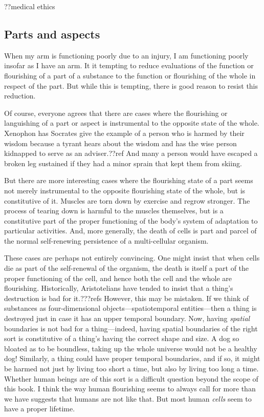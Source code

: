??medical ethics

\subsection{Parts and aspects}
When my arm is functioning poorly due to an injury, I am functioning poorly insofar
as I have an arm. It it tempting to reduce evaluations of the function or flourishing
of a part of a substance to the function or flourishing of the whole in respect of the
part. But while this is tempting, there is good reason to resist this reduction.

Of course, everyone agrees that there are cases where the flourishing or languishing of a part or aspect is
instrumental to the opposite state of the whole. Xenophon has Socrates give the example of a 
person who is harmed by their wisdom because a tyrant hears about the wisdom and has the
wise person kidnapped to serve as an adviser.??ref And many a person would have escaped a broken
leg sustained if they had a minor sprain that kept them from skiing. 

But there are more interesting cases where the flourishing state of a part seems not merely instrumental to 
the opposite flourishing state of the whole, but is constitutive of it. Muscles are torn down by exercise
and regrow stronger. The process of tearing down is harmful to the muscles themselves, but is a constitutive 
part of the proper functioning of the body's system of adaptation to particular activities. And, more
generally, the death of cells is part and parcel of the normal self-renewing persistence of a multi-cellular
organism.

These cases are perhaps not entirely convincing. One might insist that when cells die as part of the self-renewal
of the organism, the death is itself a part of the proper functioning of the cell, and hence both the cell and the
whole are flourishing. Historically, Aristotelians have tended to insist that a thing's destruction is bad
for it.???refs However, this may be mistaken. If we think of substances as four-dimensional objects---spatiotemporal
entities---then a thing is destroyed just in case it has an upper temporal boundary. Now, having \textit{spatial} 
boundaries is not bad for a thing---indeed, having spatial boundaries of the right sort is constitutive of a thing's
having the correct shape and size. A dog so bloated as to be boundless, taking up the whole universe would not be a 
healthy dog! Similarly, a thing could have proper temporal boundaries, and if so, it might be harmed not just by
living too short a time, but also by living too long a time. Whether human beings are of this sort is a difficult
question beyond the scope of this book. I think the way human flourishing seems to always call for more than we have
suggests that humans are not like that. But most human \textit{cells} seem to have a proper lifetime. 

